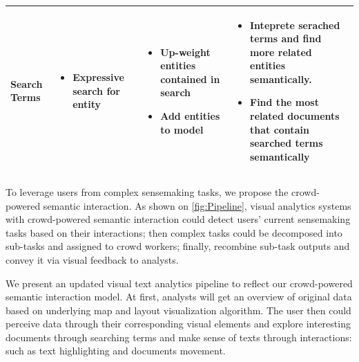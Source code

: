 \documentclass[journal]{vgtc}                %
\begin{document}
\begin{table}[t]
\begin{tabular}{| m{2.5cm} | m{4.5cm} | m{4.5cm} | m{4.5cm} |}
Search Terms & \begin{itemize}[leftmargin=.1in]
                   \item Expressive search for entity
               \end{itemize}
             & \begin{itemize}[leftmargin=.1in]
                    \item Up-weight entities contained in search
                    \item Add entities to model
               \end{itemize}
             & \begin{itemize}[leftmargin=.1in]
                    \item Inteprete serached terms and find more related entities semantically.
                    \item Find the most related documents that contain searched terms semantically
               \end{itemize} \\ \hline

\end{tabular}
\end{table}

To leverage users from complex sensemaking tasks, we propose the crowd-powered semantic interaction. As shown on \autoref{fig:Pipeline}, visual analytics systems with crowd-powered semantic interaction could detect users' current sensemaking tasks based on their interactions; then complex tasks could be decomposed into sub-tasks and assigned to crowd workers; finally, recombine sub-task outputs and convey it via visual feedback to analysts.

We present an updated visual text analytics pipeline to reflect our crowd-powered semantic interaction model.  At first, analysts will get an overview of original data based on underlying map and layout visualization algorithm. The user then could perceive data through their corresponding visual elements and explore interesting documents through searching terms and make sense of texts through interactions: such as text highlighting and documents movement.
\end{document}
